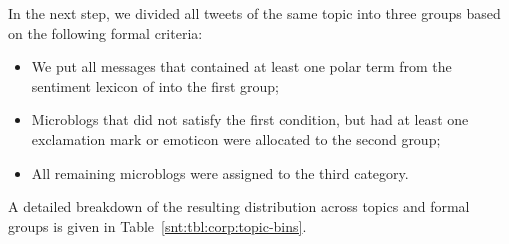 



In the next step, we divided all tweets of the same topic into three
groups based on the following formal criteria:
\begin{itemize}
\item We put all messages that contained at least one polar term from
  the sentiment lexicon of \citet{Remus:10} into the first group;
\item Microblogs that did not satisfy the first condition, but had at
  least one exclamation mark or emoticon were allocated to the second
  group;
\item All remaining microblogs were assigned to the third category.
\end{itemize}
A detailed breakdown of the resulting distribution across topics and
formal groups is given in Table~\ref{snt:tbl:corp:topic-bins}.
